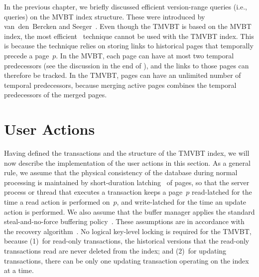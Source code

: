 In the previous chapter, we briefly discussed efficient version-range queries
(i.e.,  queries) on the MVBT index structure.
These were introduced by van~den~Bercken and
Seeger~\cite{bercken:1996:multiversion}.
Even though the TMVBT is based on the MVBT index, the most efficient
\LinkRef\ technique cannot be used with the TMVBT index.
This is because the technique relies on storing links to historical pages
that temporally precede a page~$p$.
In the MVBT, each page can have at most two temporal predecessors (see the
discussion in the end of ), and the links to those
pages can therefore be tracked.
In the TMVBT, pages can have an unlimited number of temporal predecessors,
because merging active pages combines the temporal predecessors of the
merged pages.


\section{User Actions}
\label{sec:tmvbt:actions}

Having defined the transactions and the structure of the TMVBT index, we
will now describe the implementation of the user actions in this section.
As a general rule, we assume that the physical consistency of the database
during normal processing is maintained by short-duration
latching~\cite{mohan:1992:aries} of pages, so that the server process or
thread that executes a transaction keeps a page~$p$ read-latched for the time
a read action is performed on~$p$, and write-latched for the time an update
action is performed.
We also assume that the buffer manager applies the standard
steal-and-no-force buffering policy~\cite{gray:1993:transactionprocessing}.
These assumptions are in accordance with the  recovery
algorithm~\cite{mohan:1992:aries}.
No logical key-level locking is required for the TMVBT, because 
(1)~for read-only transactions, the historical versions that the read-only
transactions read are never deleted from the index; and 
(2)~for updating transactions, there can be only one updating transaction
operating on the index at a time. 


